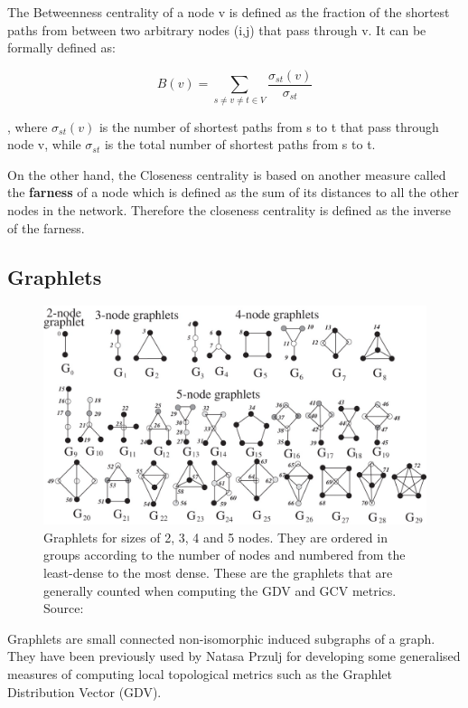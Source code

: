 The Betweenness centrality of a node v is defined as the fraction of the
shortest paths from between two arbitrary nodes (i,j) that pass through v. It
can be formally defined as:

$$ B(v) = \sum_{s \ne v \ne t \in V}\frac{\sigma_{st}(v)}{\sigma_{st}}$$

, where $\sigma_{st}(v) $ is the number of shortest paths from s to t that pass
through node v, while $ \sigma_{st} $ is the total number of shortest paths
from s to t.

On the other hand, the Closeness centrality is based on another measure called
the \textbf{farness} of a node which is defined as the sum of its distances to
all the other nodes in the network. Therefore the closeness centrality is
defined as the inverse of the farness.

\subsection{Graphlets}

\begin{figure}[h]
  \centering
\includegraphics[scale=0.25]{images/graphlets.jpg}
\caption{Graphlets for sizes of 2, 3, 4 and 5 nodes. They are ordered in
groups according to the number of nodes and numbered from the least-dense to the
most dense. These are the graphlets that are generally counted when computing
the GDV and GCV metrics. Source:\cite{milenkoviae2008uncovering} }
\label{fig:graphlets}
\end{figure}

Graphlets are small connected non-isomorphic induced subgraphs of a graph. They
have been previously used by Natasa Przulj for developing some generalised
measures of computing local topological metrics such as the Graphlet
Distribution Vector (GDV).

